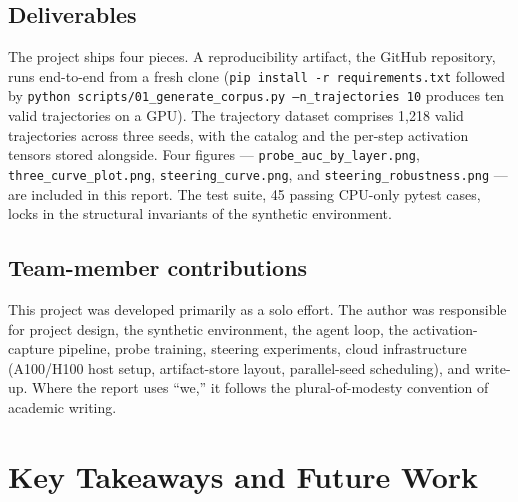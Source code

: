 \documentclass[11pt]{article}
\begin{document}
\subsection{Deliverables}

The project ships four pieces. A reproducibility artifact, the GitHub
repository, runs end-to-end from a fresh clone (\texttt{pip install -r
requirements.txt} followed by \texttt{python scripts/01\_generate\_corpus.py
--n\_trajectories 10} produces ten valid trajectories on a GPU). The
trajectory dataset comprises 1{,}218 valid trajectories across three seeds,
with the catalog and the per-step activation tensors stored alongside. Four
figures --- \texttt{probe\_auc\_by\_layer.png}, \texttt{three\_curve\_plot.png},
\texttt{steering\_curve.png}, and \texttt{steering\_robustness.png} ---
are included in this report. The test suite, 45 passing CPU-only pytest
cases, locks in the structural invariants of the synthetic environment.

\subsection{Team-member contributions}

This project was developed primarily as a solo effort. The author was
responsible for project design, the synthetic environment, the agent loop,
the activation-capture pipeline, probe training, steering experiments, cloud
infrastructure (A100/H100 host setup, artifact-store layout, parallel-seed
scheduling), and write-up. Where the report uses ``we,'' it follows the
plural-of-modesty convention of academic writing.


\section{Key Takeaways and Future Work}
\end{document}
